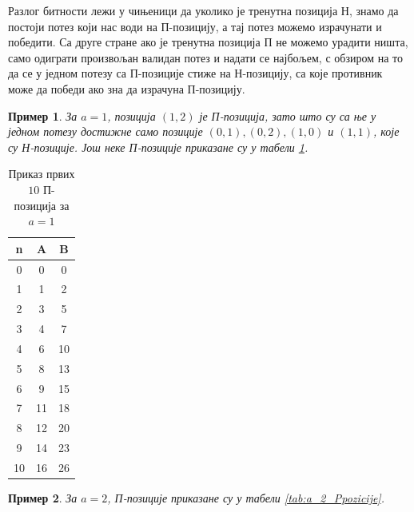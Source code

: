 \documentclass[a4paper]{article}
\newtheorem{example}{Пример}
\begin{document}
Разлог битности лежи у чињеници да уколико је тренутна позиција Н, знамо да постоји потез који нас води на П-позицију, а тај потез можемо израчунати и победити. Са друге стране ако је тренутна позиција П не можемо урадити ништа, само одиграти произвољан валидан потез и надати се најбољем, с обзиром на то да се у једном потезу са П-позиције стиже на Н-позицију, са које противник може да победи ако зна да израчуна П-позицију. 

\begin{example}
	За $ a = 1 $, позиција $ (1, 2) $ је П-позиција, зато што су са ње у једном потезу достижне само позиције $ (0, 1), (0, 2), (1, 0) $ и $ (1, 1) $, које су Н-позиције. Још неке П-позиције приказане су у табели \ref{tab:a_1_Ppozicije}. 
\end{example}

\begin{table}[h!]
	\caption{Приказ првих $ 10 $ П-позиција за $ a = 1 $}
	\label{tab:a_1_Ppozicije}
	\begin{center}
		\begin{tabular}{  c | c | c }
			{\textbf{n}} &  {\textbf{A}} &  {\textbf{B}} \\
			\hline
			0 & 0 & 0 \\
			1 & 1 & 2 \\
			2 & 3 & 5 \\
			3 & 4 & 7 \\
			4 & 6 & 10 \\
			5 & 8 & 13 \\
			6 & 9 & 15 \\
			7 & 11 & 18 \\
			8 & 12 & 20 \\
			9 & 14 & 23 \\
			10 & 16 & 26\\ 
		\end{tabular}
	\end{center}
\end{table}

\begin{example}
	За $ a = 2 $, П-позиције приказане су у табели \ref{tab:a_2_Ppozicije}.
\end{example}
\end{document}
